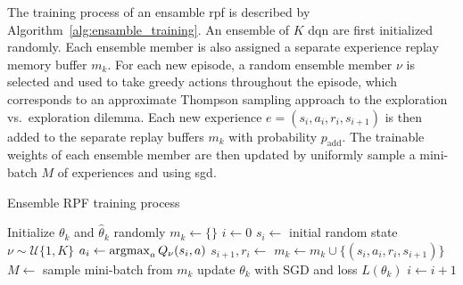 %

The training process of an ensamble \gls{rpf} is described by Algorithm~\ref{alg:ensamble_training}. 
An ensemble of $K$ \gls{dqn} are first initialized randomly. Each ensemble member is also assigned a separate experience replay memory buffer $m_k$. 
For each new episode, a random ensemble member $\nu$ is selected and used to take greedy actions throughout the episode, which corresponds to an approximate Thompson sampling approach to the exploration vs.~exploration dilemma.
Each new experience $e = (s_i, a_i, r_i, s_{i+1})$ is then added to the separate replay buffers $m_k$ with probability $p_\mathrm{add}$. The trainable weights of each ensemble member are then updated by uniformly sample a mini-batch $M$ of experiences and using \gls{sgd}.

\begin{algorithm}[h]
	\caption{Ensemble RPF training process}\label{alg:ensamble_training}
	\begin{algorithmic}[1]
			\State Initialize $\theta_k$ and $\hat{\theta}_k$ randomly
			\State $m_k \gets \{\}$
		\EndFor
		\State $i \gets 0$
			\State $s_i \gets $ initial random state
			\State $\nu \sim \mathcal{U}\{1,K\}$%
				\State $a_i \gets \operatorname*{argmax}_{a} Q_\nu(s_i,a)$
				\State $s_{i+1}, r_i \gets $ 
						\State $m_k \gets m_k \cup \{(s_i, a_i, r_i, s_{i+1})\}$
					\EndIf
					\State $M \gets $ sample mini-batch from $m_k$
					\State update $\theta_k$ with SGD and loss $L(\theta_k)$
				\EndFor
				\State $i \gets i + 1$
			\EndWhile
		\EndWhile
	\end{algorithmic}
\end{algorithm}


